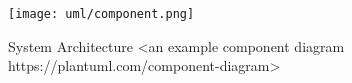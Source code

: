 \begin{figure}[h]
	\centering
	\texttt{[image: uml/component.png]}
	\caption{System Architecture <an example component diagram https://plantuml.com/component-diagram>}
	\label{fig:component}
\end{figure}

